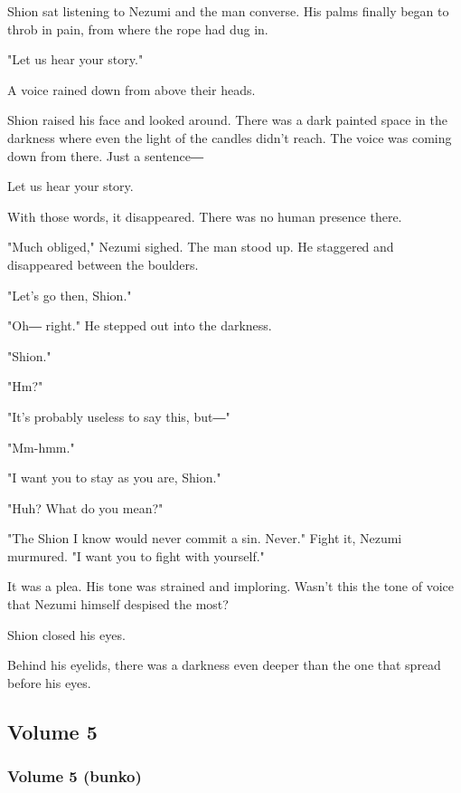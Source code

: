 Shion sat listening to Nezumi and the man converse. His palms finally
began to throb in pain, from where the rope had dug in.

"Let us hear your story."

A voice rained down from above their heads.

Shion raised his face and looked around. There was a dark painted space
in the darkness where even the light of the candles didn't reach. The
voice was coming down from there. Just a sentence―

Let us hear your story.

With those words, it disappeared. There was no human presence there.

"Much obliged," Nezumi sighed. The man stood up. He staggered and
disappeared between the boulders.

"Let's go then, Shion."

"Oh― right." He stepped out into the darkness.

"Shion."

"Hm?"

"It's probably useless to say this, but―"

"Mm-hmm."

"I want you to stay as you are, Shion."

"Huh? What do you mean?"

"The Shion I know would never commit a sin. Never." Fight it, Nezumi
murmured. "I want you to fight with yourself."

It was a plea. His tone was strained and imploring. Wasn't this the tone
of voice that Nezumi himself despised the most?

Shion closed his eyes.

Behind his eyelids, there was a darkness even deeper than the one that
spread before his eyes.

\protect\hypertarget{index_split_135.html}{}{}

\hypertarget{index_split_135.htmlux5cux23calibre_pb_138}{%
\subsection{Volume 5}\label{index_split_135.htmlux5cux23calibre_pb_138}}

\subsubsection{}

\subsubsection{Volume 5 (bunko)}

